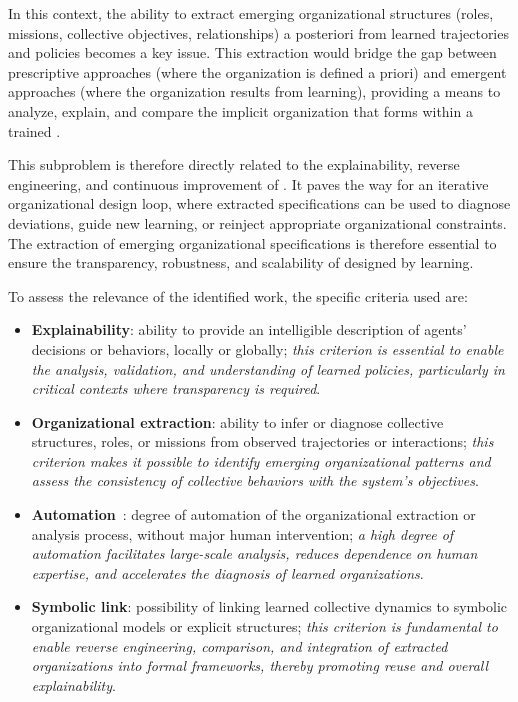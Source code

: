 In this context, the ability to extract emerging organizational structures (roles, missions, collective objectives, relationships) a posteriori from learned trajectories and policies becomes a key issue. This extraction would bridge the gap between prescriptive approaches (where the organization is defined a priori) and emergent approaches (where the organization results from learning), providing a means to analyze, explain, and compare the implicit organization that forms within a trained .

This subproblem is therefore directly related to the explainability, reverse engineering, and continuous improvement of . It paves the way for an iterative organizational design loop, where extracted specifications can be used to diagnose deviations, guide new learning, or reinject appropriate organizational constraints. The extraction of emerging organizational specifications is therefore essential to ensure the transparency, robustness, and scalability of  designed by learning.

To assess the relevance of the identified work, the specific criteria used are:
\begin{itemize}
  \item \textbf{Explainability}: ability to provide an intelligible description of agents' decisions or behaviors, locally or globally; \emph{this criterion is essential to enable the analysis, validation, and understanding of learned policies, particularly in critical contexts where transparency is required}.
  \item \textbf{Organizational extraction}: ability to infer or diagnose collective structures, roles, or missions from observed trajectories or interactions; \emph{this criterion makes it possible to identify emerging organizational patterns and assess the consistency of collective behaviors with the system's objectives}.
  \item \textbf{Automation}~: degree of automation of the organizational extraction or analysis process, without major human intervention; \emph{a high degree of automation facilitates large-scale analysis, reduces dependence on human expertise, and accelerates the diagnosis of learned organizations}.
  \item \textbf{Symbolic link}: possibility of linking learned collective dynamics to symbolic organizational models or explicit structures; \emph{this criterion is fundamental to enable reverse engineering, comparison, and integration of extracted organizations into formal frameworks, thereby promoting reuse and overall explainability}.
\end{itemize}

